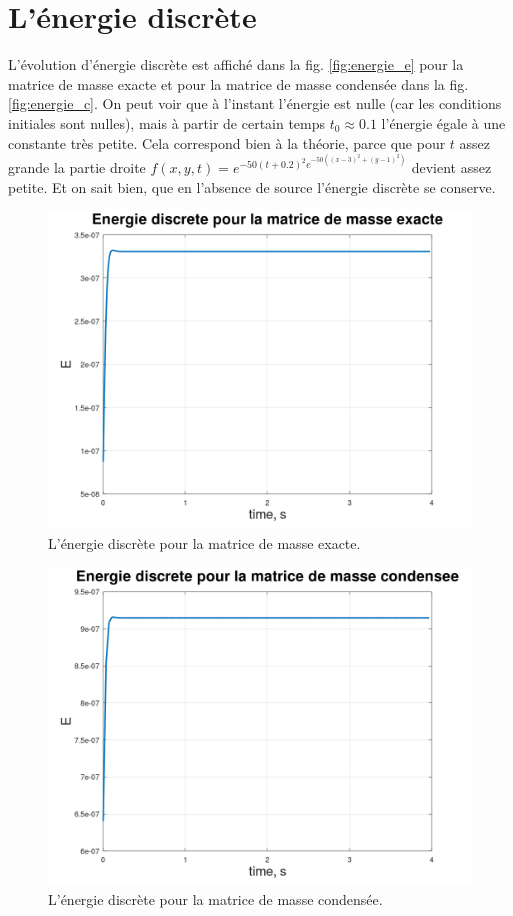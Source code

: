 \documentclass[12pt]{article}
\begin{document}
\section{L'énergie discrète}
L'évolution d'énergie discrète est affiché dans la fig. \eqref{fig:energie_e} pour la matrice de masse exacte et  pour la matrice de masse condensée dans la fig. \eqref{fig:energie_c}. On peut voir que  à l'instant l'énergie est nulle (car les conditions initiales sont nulles), mais à partir de certain temps $t_0 \approx 0.1$ l'énergie égale à une constante très petite. Cela correspond bien à la théorie, parce que pour $t$ assez grande la partie droite $f(x, y, t) = e^{-50(t + 0.2)^2 e^{-50((x - 3)^2 + (y - 1)^2)}} $ devient assez petite. Et on sait bien, que en l'absence de source l'énergie discrète se conserve.
\begin{figure}
	\centering
	\includegraphics[height=0.4\linewidth]{images/E_01}
	\caption{L'énergie discrète pour la matrice de masse exacte.}
	\label{fig:energie_e}
\end{figure}
\begin{figure}
	\centering
	\includegraphics[height=0.4\linewidth]{images/E_cond_01}
	\caption{L'énergie discrète pour la matrice de masse condensée.}
	\label{fig:energie_c}
\end{figure}	
\end{document}
